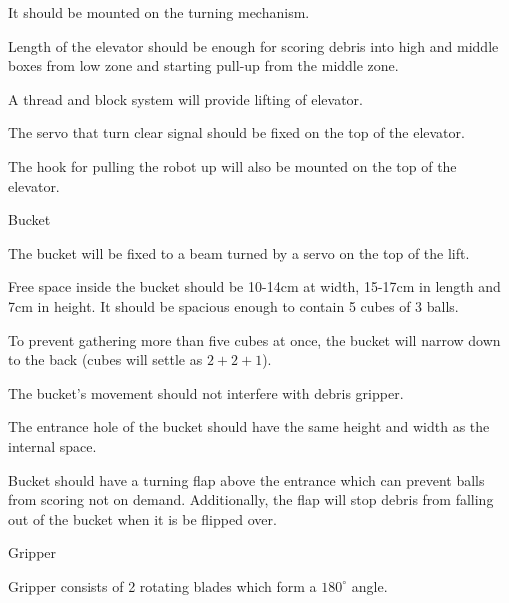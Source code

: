 \begin{enumerate*}
\begin{enumerate*}
  		\item It should be mounted on the turning mechanism.
  		
  		\item Length of the elevator should be enough for scoring debris into high and middle boxes from low zone and starting pull-up from the middle zone. 
  		
  		\item A thread and block system will provide lifting of elevator.
  		
  		\item The servo that turn clear signal should be fixed on the top of the elevator.
  		
  		\item The hook for pulling the robot up will also be mounted on the top of the elevator.
  		
  	\end{enumerate*}
  	
  	\item Bucket
  	\begin{enumerate*}
  		
  		\item The bucket will be fixed to a beam turned by a servo on the top of the lift.
  		
  		\item Free space inside the bucket should be 10-14cm at width, 15-17cm in length and 7cm in height. It should be spacious enough to contain 5 cubes of 3 balls.
  		
  		\item To prevent gathering more than five cubes at once, the bucket will narrow down to the back (cubes will settle as $2+2+1$). 
  		
  		\item The bucket's movement should not interfere with debris gripper.
  		
  		
  		\item The entrance hole of the bucket should have the same height and width as the internal space.
  		
  		\item Bucket should have a turning flap above the entrance which can prevent balls from scoring not on demand. Additionally, the flap will stop debris from falling out of the bucket when it is be flipped over.
  	\end{enumerate*}
  	
  	\item Gripper
  	\begin{enumerate*}
  		\item Gripper consists of 2 rotating blades which form a $180^{\circ}$ angle.
  		

\end{enumerate*}
\end{enumerate*}

